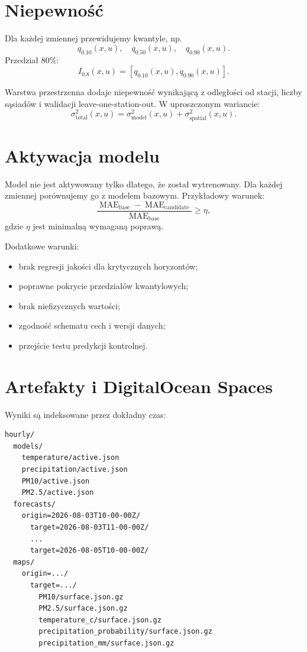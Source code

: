 \documentclass[11pt,a4paper,oneside]{article}
\begin{document}
\section{Niepewność}

Dla każdej zmiennej przewidujemy kwantyle, np.
\[
  q_{0.10}(x,u),\quad q_{0.50}(x,u),\quad q_{0.90}(x,u).
\]
Przedział 80\%:
\[
  I_{0.8}(x,u)=
  [q_{0.10}(x,u),q_{0.90}(x,u)].
\]

Warstwa przestrzenna dodaje niepewność wynikającą z odległości od stacji,
liczby sąsiadów i walidacji leave-one-station-out. W uproszczonym wariancie:
\begin{equation}
  \sigma_{\mathrm{total}}^2(x,u)
  =
  \sigma_{\mathrm{model}}^2(x,u)
  +
  \sigma_{\mathrm{spatial}}^2(x,u).
\end{equation}

\section{Aktywacja modelu}

Model nie jest aktywowany tylko dlatego, że został wytrenowany. Dla każdej
zmiennej porównujemy go z modelem bazowym. Przykładowy warunek:
\begin{equation}
  \frac{\operatorname{MAE}_{\mathrm{base}}-
        \operatorname{MAE}_{\mathrm{candidate}}}
       {\operatorname{MAE}_{\mathrm{base}}}
  \ge \eta,
\end{equation}
gdzie $\eta$ jest minimalną wymaganą poprawą.

Dodatkowe warunki:
\begin{itemize}[nosep]
  \item brak regresji jakości dla krytycznych horyzontów;
  \item poprawne pokrycie przedziałów kwantylowych;
  \item brak niefizycznych wartości;
  \item zgodność schematu cech i wersji danych;
  \item przejście testu predykcji kontrolnej.
\end{itemize}

\section{Artefakty i DigitalOcean Spaces}

Wyniki są indeksowane przez dokładny czas:
\begin{lstlisting}[style=code]
hourly/
  models/
    temperature/active.json
    precipitation/active.json
    PM10/active.json
    PM2.5/active.json
  forecasts/
    origin=2026-08-03T10-00-00Z/
      target=2026-08-03T11-00-00Z/
      ...
      target=2026-08-05T10-00-00Z/
  maps/
    origin=.../
      target=.../
        PM10/surface.json.gz
        PM2.5/surface.json.gz
        temperature_c/surface.json.gz
        precipitation_probability/surface.json.gz
        precipitation_mm/surface.json.gz
\end{lstlisting}
\end{document}
